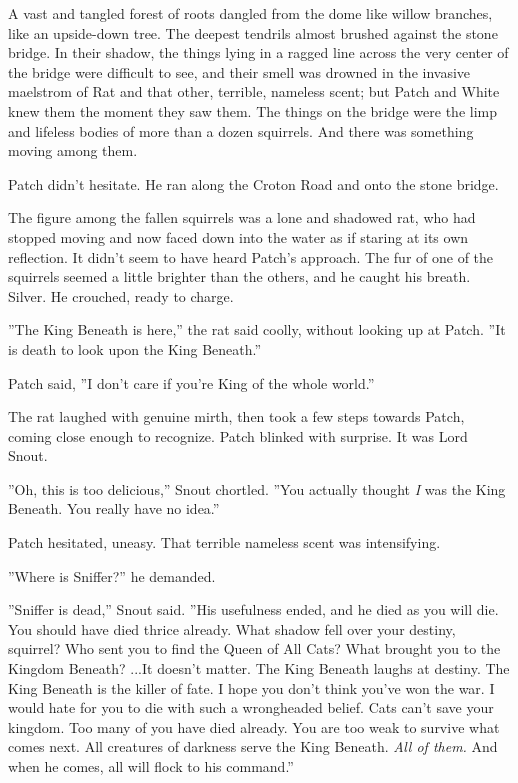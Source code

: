 \documentclass[11pt]{article}
\begin{document}
A vast and tangled forest of roots dangled from the dome like willow branches, like an upside-down tree. The deepest tendrils almost brushed against the stone bridge. In their shadow, the things lying in a ragged line across the very center of the bridge were difficult to see, and their smell was drowned in the invasive maelstrom of Rat and that other, terrible, nameless scent; but Patch and White knew them the moment they saw them. The things on the bridge were the limp and lifeless bodies of more than a dozen squirrels. And there was something moving among them.\par
 Patch didn't hesitate. He ran along the Croton Road and onto the stone bridge.\par
The figure among the fallen squirrels was a lone and shadowed rat, who had stopped moving and now faced down into the water as if staring at its own reflection. It didn't seem to have heard Patch's approach. The fur of one of the squirrels seemed a little brighter than the others, and he caught his breath. Silver. He crouched, ready to charge.\par
 ''The King Beneath is here,'' the rat said coolly, without looking up at Patch. ''It is death to look upon the King Beneath.''\par
 Patch said, ''I don't care if you're King of the whole world.''\par
 The rat laughed with genuine mirth, then took a few steps towards Patch, coming close enough to recognize. Patch blinked with surprise. It was Lord Snout.\par
''Oh, this is too delicious,'' Snout chortled. ''You actually thought {\it I} was the King Beneath. You really have no idea.''\par
Patch hesitated, uneasy. That terrible nameless scent was intensifying.\par
''Where is Sniffer?'' he demanded.\par
''Sniffer is dead,'' Snout said. ''His usefulness ended, and he died as you will die. You should have died thrice already. What shadow fell over your destiny, squirrel? Who sent you to find the Queen of All Cats? What brought you to the Kingdom Beneath? ...It doesn't matter. The King Beneath laughs at destiny. The King Beneath is the killer of fate. I hope you don't think you've won the war. I would hate for you to die with such a wrongheaded belief. Cats can't save your kingdom. Too many of you have died already. You are too weak to survive what comes next. All creatures of darkness serve the King Beneath. {\it All of them.} And when he comes, all will flock to his command.''\par
\end{document}
